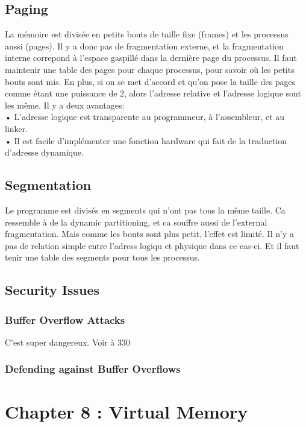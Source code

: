 \subsection{Paging}
La mémoire est divisée en petits bouts de taille fixe (frames) et les processus aussi (pages). Il y a donc pas de fragmentation externe, et la fragmentation interne correpond à l'espace gaspillé dans la dernière page du processus. Il faut maintenir une table des pages pour chaque processus, pour savoir où les petits bouts sont mis. En plus, si on se met d'accord et qu'on pose la taille des pages comme étant une puissance de 2, alors l'adresse relative et l'adresse logique sont les même. Il y a deux avantages: \\
• L'adresse logique est transparente au programmeur, à l'assembleur, et au linker.  \\
• Il est facile d'implémenter une fonction hardware qui fait de la traduction d'adresse
dynamique.
\subsection{Segmentation}
Le programme est divisés en segments qui n'ont pas tous la même taille. Ca ressemble à de la dynamic partitioning, et ca souffre aussi de l'external fragmentation. Mais comme les bouts sont plus petit, l'effet est limité. Il n'y a pas de relation simple entre l'adress logiqu et physique dans ce cas-ci. Et il faut tenir une table des segments pour tous les processus.
\subsection{Security Issues}
\subsubsection{Buffer Overflow Attacks}
C'est super dangereux. Voir \cite[p.~327]{stallings} à 330
\subsubsection{Defending against Buffer Overflows}

\newpage


\section{Chapter 8 : Virtual Memory}

